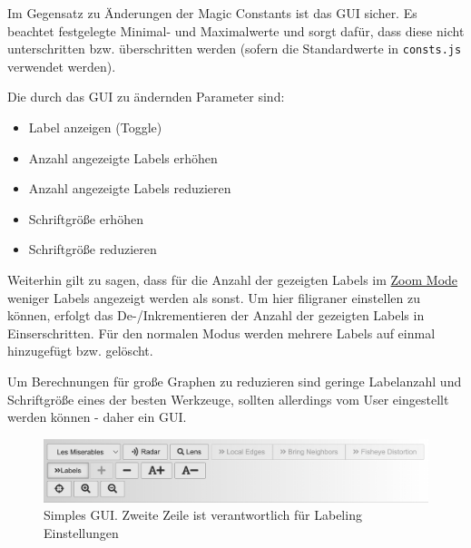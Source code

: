 
Im Gegensatz zu Änderungen der Magic Constants ist das GUI sicher. Es beachtet festgelegte Minimal- und Maximalwerte
und sorgt dafür, dass diese nicht unterschritten bzw. überschritten werden (sofern die Standardwerte in \texttt{consts.js} verwendet werden).

Die durch das GUI zu ändernden Parameter sind:
\begin{itemize}
    \item Label anzeigen (Toggle)
    \item Anzahl angezeigte Labels erhöhen
    \item Anzahl angezeigte Labels reduzieren
    \item Schriftgröße erhöhen
    \item Schriftgröße reduzieren
\end{itemize}

Weiterhin gilt zu sagen, dass für die Anzahl der gezeigten Labels im \hyperref[subsec:zoom]{Zoom Mode} weniger Labels angezeigt werden als sonst.
Um hier filigraner einstellen zu können, erfolgt das De-/Inkrementieren der Anzahl der gezeigten Labels in Einserschritten.
Für den normalen Modus werden mehrere Labels auf einmal hinzugefügt bzw. gelöscht.

Um Berechnungen für große Graphen zu reduzieren sind geringe Labelanzahl und Schriftgröße eines der besten Werkzeuge, sollten allerdings vom User eingestellt werden können - daher ein GUI.

\begin{figure}[H]
    \centering
    \includegraphics[width=\linewidth]{../img/gui}
    \caption{Simples GUI. Zweite Zeile ist verantwortlich für Labeling Einstellungen}
    \label{fig:gui}
\end{figure}
